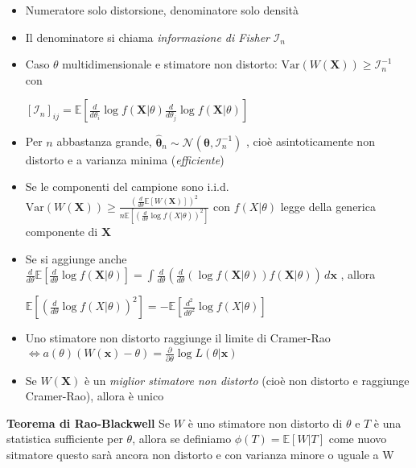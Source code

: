 \documentclass[openany]{book} %
\begin{document}
\begin{itemize}

\item Numeratore solo distorsione, denominatore solo densità

\item Il denominatore si chiama \textit{informazione di Fisher} $\mathcal{I}_n$

\item Caso $\theta$ multidimensionale e stimatore non distorto: $\text{Var}(W(\boldsymbol{X}))\geq \mathcal{I}_n^{-1}$ con 

$[\mathcal{I}_n]_{ij}=\mathbb{E}[\frac{d}{d\theta_i}\log f(\boldsymbol{X}|\theta)\frac{d}{d\theta_j}\log f(\boldsymbol{X}|\theta)]$

\item Per $n$ abbastanza grande, $\hat {\boldsymbol{\theta}}_n\sim \mathcal{N}(\boldsymbol{\theta},\mathcal{I}_n^{-1})$ , cioè asintoticamente non distorto e a varianza minima (\textit{efficiente})

\item Se le componenti del campione sono i.i.d. $\text{Var}(W(\boldsymbol{X}))\geq \frac{(\frac{d}{d\theta}\mathbb{E}[W(\boldsymbol{X})])^2}{n\mathbb{E}[(\frac{d}{d\theta}\log f(X|\theta))^2]}$ con $f(X|\theta)$  legge della generica componente di $\boldsymbol{X}$

\item Se si aggiunge anche $\frac{d}{d\theta}\mathbb{E}[\frac{d}{d\theta}\log f(\boldsymbol{X}|\theta)]=\int\frac{d}{d\theta}(\frac{d}{d\theta}(\log f(\boldsymbol{X}|\theta))f(\boldsymbol{X}|\theta))\,d \boldsymbol{x}$ , allora 

$\mathbb{E}[(\frac{d}{d\theta}\log f(X|\theta))^2]=-\mathbb{E}[\frac{d^2}{d\theta^2}\log f(X|\theta)]$

\item Uno stimatore non distorto raggiunge il limite di Cramer-Rao $\Leftrightarrow a(\theta)(W(\boldsymbol{x})-\theta)=\frac{\partial}{\partial\theta}\log L(\theta|\boldsymbol{x})$

\item Se $W(\boldsymbol{X})$ è un \textit{miglior stimatore non distorto} (cioè non distorto e raggiunge Cramer-Rao), allora è unico

\end{itemize}

\textbf{Teorema di Rao-Blackwell} Se $W$ è uno stimatore non distorto di $\theta$ e $T$ è una statistica sufficiente per $\theta$, allora se definiamo $\phi(T)=\mathbb{E}[W|T]$ come nuovo sitmatore questo sarà ancora non distorto e con varianza minore o uguale a W
\end{document}
